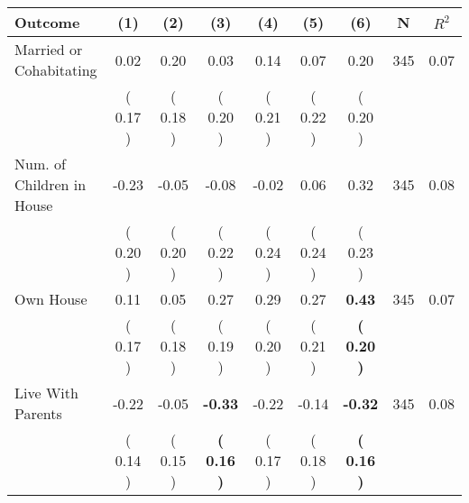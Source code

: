 \begin{tabular}{lcccccccc}
\toprule
 \textbf{Outcome} & \textbf{(1)} & \textbf{(2)} & \textbf{(3)} & \textbf{(4)} & \textbf{(5)} & \textbf{(6)} & \textbf{N} & \textbf{$ R^2$} \\
\midrule
Married or Cohabitating &      0.02 &      0.20 &      0.03 &      0.14 &      0.07 &      0.20 & 345 &       0.07 \\ 
 & (     0.17 ) & (     0.18 ) & (     0.20 ) & (     0.21 ) & (     0.22 ) & (     0.20 ) & \\
Num. of Children in House &     -0.23 &     -0.05 &     -0.08 &     -0.02 &      0.06 &      0.32 & 345 &       0.08 \\ 
 & (     0.20 ) & (     0.20 ) & (     0.22 ) & (     0.24 ) & (     0.24 ) & (     0.23 ) & \\
Own House &      0.11 &      0.05 &      0.27 &      0.29 &      0.27 & \textbf{     0.43} & 345 &       0.07 \\ 
 & (     0.17 ) & (     0.18 ) & (     0.19 ) & (     0.20 ) & (     0.21 ) & \textbf{(     0.20 )} & \\
Live With Parents &     -0.22 &     -0.05 & \textbf{    -0.33} &     -0.22 &     -0.14 & \textbf{    -0.32} & 345 &       0.08 \\ 
 & (     0.14 ) & (     0.15 ) & \textbf{(     0.16 )} & (     0.17 ) & (     0.18 ) & \textbf{(     0.16 )} & \\
\bottomrule
\end{tabular}
